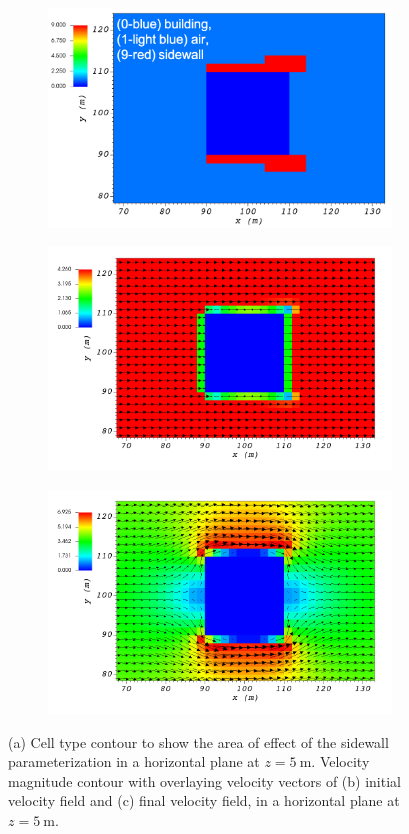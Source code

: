 \begin{figure}[H]
    \centering
    \begin{subfigure}{\textwidth}
    \centering
    \includegraphics[width=10.3cm,keepaspectratio]{Images/sidewall_z_5_1_init_icell.png}
    \caption{}
    \end{subfigure}
    \begin{subfigure}{\textwidth}
    \centering
    \includegraphics[width=11.0cm,keepaspectratio]{Images/sidewall_z_5_1_init_vel.png}
    \caption{}
    \end{subfigure}
    \begin{subfigure}{\textwidth}
    \centering
    \includegraphics[width=11.0cm,keepaspectratio]{Images/sidewall_z_5_1_final.png}
    \caption{}
    \end{subfigure}
    \caption{(a) Cell type contour to show the area of effect of the sidewall parameterization in a horizontal plane at $z=5\ \si{\meter}$. Velocity magnitude contour with overlaying velocity vectors of (b) initial velocity field and (c) final velocity field, in a horizontal plane at $z=5\ \si{\meter}$.}
\end{figure}

